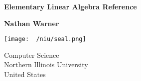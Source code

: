 \documentclass{report}
\title{\Huge{}}
\author{\huge{Nathan Warner}}
\date{\huge{}}
\begin{document}
        \begin{titlepage}
       \begin{center}
           \vspace*{1cm}
    
           \textbf{Elementary Linear Algebra Reference}
    
           \vspace{0.5cm}
                
                
           \vspace{1.5cm}
    
           \textbf{Nathan Warner}
    
           \vfill
                
                
           \vspace{0.8cm}
         
           \texttt{[image: ~/niu/seal.png]}
                
           Computer Science \\
           Northern Illinois University\\
           United States\\
           
                
       \end{center}
    \end{titlepage}
    \tableofcontents
    \pagebreak 
\end{document}
